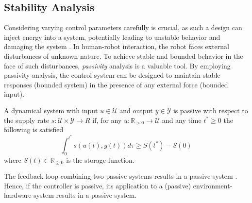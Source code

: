 \iflong
\subsection{Stability Analysis} \label{sec:trad_passive}
Considering varying control parameters carefully is crucial, as such a design can inject energy into a system, potentially leading to unstable behavior and damaging the system \cite{ferraguti2013tank}.
In human-robot interaction, the robot faces external disturbances of unknown nature. To achieve stable and bounded behavior in the face of such disturbances, \textit{passivity} analysis is a valuable tool. By employing passivity analysis, the control system can be designed to maintain stable responses (bounded system) in the presence of any external force (bounded input). 

\begin{definition} \label{def:passivity}
	A dynamical system with input $ u \in \mathcal{U}$ and output $y \in \mathcal{Y}$ is passive with respect to the supply rate $s : \mathcal{U} \times \mathcal{Y} \rightarrow{R}$ if, for any $u: \mathbb{R}_{>0} \rightarrow \mathcal{U}$ and any time $t^* \geq 0$ the following is satisfied
  \begin{equation}
	  \int_0^{t^*} s \left( u(t),  y (t) \right) d \tau \geq S(t^*) - S(0) 
  \end{equation}
  where $S(t) \in \mathbb{R}_{\geq 0}$ is the storage function.
\end{definition}

The feedback loop combining two passive systems results in a passive system \cite{sepulchre2012constructive}. Hence, if the controller is passive, its application to a (passive) environment-hardware system results in a passive system.
\fi
